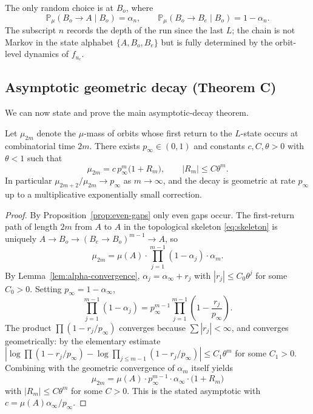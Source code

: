 The only random choice is at $B_o$, where
\[
    \mathbb{P}_{\!\mu}(B_o \to A \mid B_o) = \alpha_n,
    \qquad
    \mathbb{P}_{\!\mu}(B_o \to B_e \mid B_o) = 1 - \alpha_n.
\]
The subscript $n$ records the depth of the run since the last $L$; the
chain is not Markov in the state alphabet $\{A, B_o, B_e\}$ but is
fully determined by the orbit-level dynamics of $f_{u_c}$.



\subsection{Asymptotic geometric decay (Theorem C)}

We can now state and prove the main asymptotic-decay theorem.

\begin{theorem}
\label{thm:geometric-decay}
Let $\mu_{2m}$ denote the $\mu$-mass of orbits whose first return to the
$L$-state occurs at combinatorial time $2m$. There exists
$p_\infty \in (0, 1)$ and constants $c, C, \theta > 0$ with $\theta < 1$
such that
\[
    \mu_{2m} = c\, p_\infty^{m} \bigl(1 + R_m\bigr),
    \qquad |R_m| \leq C \theta^m.
\]
In particular $\mu_{2m+2}/\mu_{2m} \to p_\infty$ as $m \to \infty$, and
the decay is geometric at rate $p_\infty$ up to a multiplicative
exponentially small correction.
\end{theorem}

\begin{proof}
By Proposition~\ref{prop:even-gaps} only even gaps occur. The first-return
path of length $2m$ from $A$ to $A$ in the topological skeleton
\eqref{eq:skeleton} is uniquely $A \to B_o \to (B_e \to B_o)^{m-1} \to A$,
so
\[
    \mu_{2m} = \mu(A) \cdot \prod_{j=1}^{m-1} (1 - \alpha_j) \cdot \alpha_m.
\]
By Lemma~\ref{lem:alpha-convergence}, $\alpha_j = \alpha_\infty + r_j$
with $|r_j| \leq C_0 \theta^j$ for some $C_0 > 0$. Setting
$p_\infty = 1 - \alpha_\infty$,
\[
    \prod_{j=1}^{m-1} (1 - \alpha_j)
    = p_\infty^{m-1} \prod_{j=1}^{m-1} \left( 1 - \frac{r_j}{p_\infty} \right).
\]
The product $\prod (1 - r_j / p_\infty)$ converges because
$\sum |r_j| < \infty$, and converges geometrically: by the elementary
estimate $|\log \prod (1 - r_j/p_\infty) - \log \prod_{j \leq m-1}(1 - r_j/p_\infty)|
\leq C_1 \theta^m$ for some $C_1 > 0$. Combining with the geometric
convergence of $\alpha_m$ itself yields
\[
    \mu_{2m} = \mu(A) \cdot p_\infty^{m-1} \cdot \alpha_\infty
              \cdot \bigl(1 + R_m\bigr)
\]
with $|R_m| \leq C \theta^m$ for some $C > 0$. This is the stated
asymptotic with $c = \mu(A) \alpha_\infty / p_\infty$.
\end{proof}

